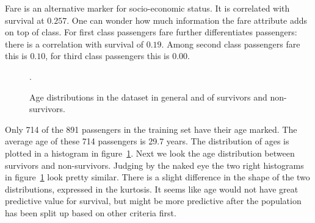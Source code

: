 \documentclass{llncs}
\begin{document}
Fare is an alternative marker for socio-economic status. It is correlated with survival at $0.257$. One can wonder how much information the fare attribute adds on top of class. For first class passengers fare further differentiates passengers: there is a correlation with survival of $0.19$. Among second class passengers fare this is $0.10$, for third class passengers this is $0.00$.
\begin{figure}[]
    \centering
    \hfill
    \hfill
    \caption{Age distributions in the dataset in general and of survivors and non-survivors.}
    \label{fig:age_histogram}.
\end{figure}
\noindent
Only 714 of the 891 passengers in the training set have their age marked. The average age of these 714 passengers is 29.7 years. The distribution of ages is plotted in a histogram in figure~\ref{fig:age_histogram}. Next we look the age distribution between survivors and non-survivors. Judging by the naked eye the two right histograms in figure~\ref{fig:age_histogram} look pretty similar. There is a slight difference in the shape of the two distributions, expressed in the kurtosis.  It seems like age would not have great predictive value for survival, but might be more predictive after the population has been split up based on other criteria first.
\end{document}
